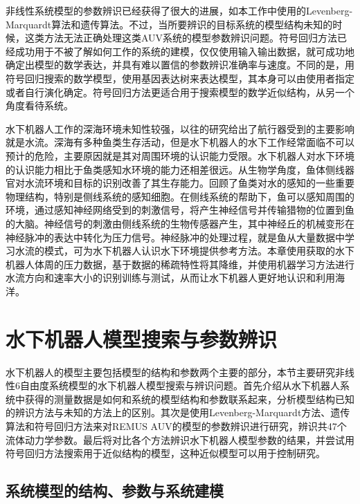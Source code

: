 非线性系统模型的参数辨识已经获得了很大的进展，如本工作中使用的Levenberg-Marquardt算法和遗传算法\cite{baruch2009levenberg,zhou2013genetic}。不过，当所要辨识的目标系统的模型结构未知的时候，这类方法无法正确处理这类AUV系统的模型参数辨识问题。符号回归方法已经成功用于不被了解如何工作的系统的建模，仅仅使用输入输出数据，就可成功地确定出模型的数学表达，并具有难以置信的参数辨识准确率与速度\cite{menezes2014symbolic,Moreno2015Symbolic,wu2016parametric}。不同的是，用符号回归搜索的数学模型，使用基因表达树来表达模型，其本身可以由使用者指定或者自行演化确定。符号回归方法更适合用于搜索模型的数学近似结构，从另一个角度看待系统。

水下机器人工作的深海环境未知性较强，以往的研究给出了航行器受到的主要影响就是水流。深海有多种鱼类生存活动，但是水下机器人的水下工作经常面临不可以预计的危险，主要原因就是其对周围环境的认识能力受限。水下机器人对水下环境的认识能力相比于鱼类感知水环境的能力还相差很远\cite{verschure2003environmentally}。从生物学角度，鱼体侧线器官对水流环境和目标的识别改善了其生存能力。回顾了鱼类对水的感知的一些重要物理结构，特别是侧线系统的感知细胞。在侧线系统的帮助下，鱼可以感知周围的环境，通过感知神经网络受到的刺激信号，将产生神经信号并传输猎物的位置到鱼的大脑\cite{abdulsadda2012artificial,Wu2016lateralline}。神经信号的刺激由侧线系统的生物传感器产生，其中神经丘的机械变形在神经脉冲的表达中转化为压力信号。神经脉冲的处理过程，就是鱼从大量数据中学习水流的模式，可为水下机器人认识水下环境提供参考方法\cite{huang2015trends,martis2013ecg,chen2000new,liu2012support,tagliaferri2015wind}。本章使用获取的水下机器人体周的压力数据，基于数据的稀疏特性将其降维，并使用机器学习方法进行水流方向和速率大小的识别训练与测试，从而让水下机器人更好地认识和利用海洋。

\section{水下机器人模型搜索与参数辨识 }

水下机器人的模型主要包括模型的结构和参数两个主要的部分，本节主要研究非线性6自由度系统模型的水下机器人模型搜索与辨识问题。首先介绍从水下机器人系统中获得的测量数据是如何和系统的模型结构和参数联系起来，分析模型结构已知的辨识方法与未知的方法上的区别。其次是使用Levenberg-Marquardt方法、遗传算法和符号回归方法来对REMUS AUV的模型的参数辨识进行研究，辨识共47个流体动力学参数。最后将对比各个方法辨识水下机器人模型参数的结果，并尝试用符号回归方法搜索用于近似结构的模型，这种近似模型可以用于控制研究。

\subsection{系统模型的结构、参数与系统建模}

